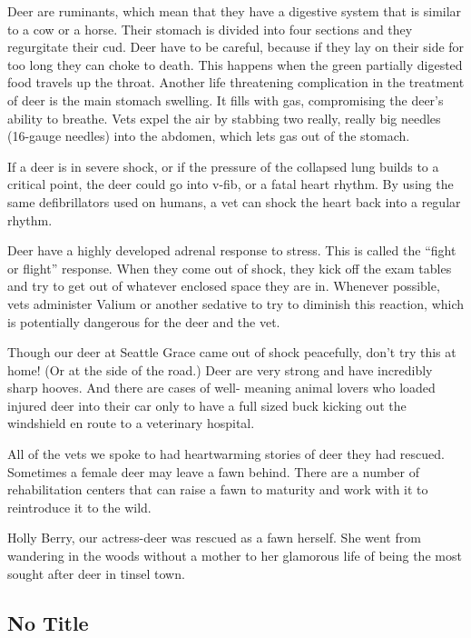 \documentclass[12pt,a4paper,onecolumn]{article}
\begin{document}
Deer are ruminants\cite{ruminant}, which mean that they have a digestive system that is similar to a
cow or a horse. Their stomach is divided into four sections and they regurgitate\cite{regurgitate}
their cud\cite{cud}. Deer have to be careful, because if they lay on their side for too long they
can choke to death. This happens when the green partially digested food travels up the throat.
Another life threatening complication in the treatment of deer is the main stomach swelling. It
fills with gas, compromising the deer's ability to breathe. Vets expel the air by stabbing two
really, really big needles (16-gauge needles) into the abdomen, which lets gas out of the stomach.

If a deer is in severe shock, or if the pressure of the collapsed lung builds to a critical point,
the deer could go into v-fib, or a fatal heart rhythm. By using the same
defibrillators\cite{defibrillator} used on humans, a vet can shock the heart back into a regular
rhythm.

Deer have a highly developed adrenal\cite{adrenal} response to stress. This is called the ``fight or
flight'' response. When they come out of shock, they kick off the exam tables and try to get out of
whatever enclosed space they are in. Whenever possible, vets administer Valium or another
sedative\cite{sedative} to try to diminish this reaction, which is potentially dangerous for the
deer and the vet.

Though our deer at Seattle Grace came out of shock peacefully, don't try this at home! (Or at the
side of the road.) Deer are very strong and have incredibly sharp hooves. And there are cases of
well- meaning animal lovers who loaded injured deer into their car only to have a full sized buck
kicking out the windshield en route to a veterinary hospital.

All of the vets we spoke to had heartwarming stories of deer they had rescued. Sometimes a female
deer may leave a fawn\cite{fawn} behind. There are a number of rehabilitation centers that can raise
a fawn to maturity and work with it to reintroduce it to the wild.

Holly Berry, our actress-deer was rescued as a fawn herself. She went from wandering in the woods
without a mother to her glamorous life of being the most sought after deer in tinsel town.

\subsection{No Title}
\end{document}
